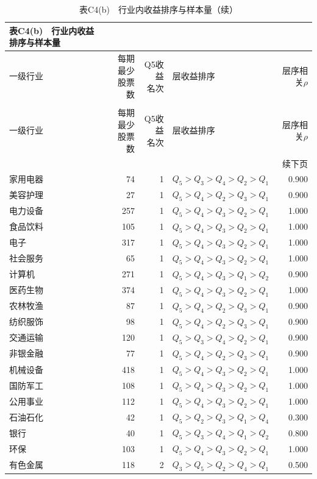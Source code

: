 \begingroup\small\setlength{\tabcolsep}{4pt}
\begin{longtable}{lrrlr}
\caption*{\textbf{表C4(b)　行业内收益排序与样本量}}\\
\toprule
一级行业 & \makecell{每期最少\\股票数} & \makecell{Q5收益\\名次} & 层收益排序 & 层序相关$\rho$ \\ \midrule
\endfirsthead
\caption*{表C4(b)　行业内收益排序与样本量（续）}\\\toprule
一级行业 & \makecell{每期最少\\股票数} & \makecell{Q5收益\\名次} & 层收益排序 & 层序相关$\rho$ \\ \midrule
\endhead
\midrule\multicolumn{5}{r}{续下页}\\\endfoot
\bottomrule\endlastfoot
家用电器 & 74 & 1 & $Q_5>Q_3>Q_4>Q_2>Q_1$ & 0.900 \\
美容护理 & 27 & 1 & $Q_5>Q_4>Q_2>Q_3>Q_1$ & 0.900 \\
电力设备 & 257 & 1 & $Q_5>Q_4>Q_3>Q_2>Q_1$ & 1.000 \\
食品饮料 & 105 & 1 & $Q_5>Q_4>Q_3>Q_2>Q_1$ & 1.000 \\
电子 & 317 & 1 & $Q_5>Q_4>Q_3>Q_2>Q_1$ & 1.000 \\
社会服务 & 65 & 1 & $Q_5>Q_4>Q_3>Q_2>Q_1$ & 1.000 \\
计算机 & 271 & 1 & $Q_5>Q_4>Q_3>Q_1>Q_2$ & 0.900 \\
医药生物 & 374 & 1 & $Q_5>Q_4>Q_3>Q_2>Q_1$ & 1.000 \\
农林牧渔 & 87 & 1 & $Q_5>Q_4>Q_2>Q_3>Q_1$ & 0.900 \\
纺织服饰 & 98 & 1 & $Q_5>Q_4>Q_2>Q_3>Q_1$ & 0.900 \\
交通运输 & 120 & 1 & $Q_5>Q_3>Q_4>Q_2>Q_1$ & 0.900 \\
非银金融 & 77 & 1 & $Q_5>Q_4>Q_2>Q_3>Q_1$ & 0.900 \\
机械设备 & 418 & 1 & $Q_5>Q_4>Q_3>Q_2>Q_1$ & 1.000 \\
国防军工 & 108 & 1 & $Q_5>Q_4>Q_3>Q_2>Q_1$ & 1.000 \\
公用事业 & 112 & 1 & $Q_5>Q_4>Q_3>Q_2>Q_1$ & 1.000 \\
石油石化 & 42 & 1 & $Q_5>Q_2>Q_3>Q_1>Q_4$ & 0.300 \\
银行 & 40 & 1 & $Q_5>Q_3>Q_4>Q_1>Q_2$ & 0.800 \\
环保 & 103 & 1 & $Q_5>Q_4>Q_3>Q_2>Q_1$ & 1.000 \\
有色金属 & 118 & 2 & $Q_3>Q_5>Q_2>Q_4>Q_1$ & 0.500 \\

\end{longtable}
